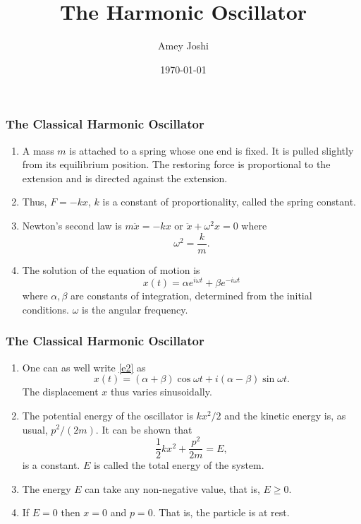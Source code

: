 \documentclass{beamer}
\title{The Harmonic Oscillator}
\author{Amey Joshi}
\date{\today}
\begin{document}
\begin{frame}
\titlepage
\end{frame}

\begin{frame}
\frametitle{The Classical Harmonic Oscillator}
\begin{enumerate}
\item A mass $m$ is attached to a spring whose one end is fixed. It is pulled
slightly from its equilibrium position. The restoring force is proportional to
the extension and is directed against the extension.
\item Thus, $F = -kx$, $k$ is a constant of proportionality, called the spring
constant.
\item Newton's second law is $m\ddot{x} = -kx$ or $\ddot{x} + \omega^2 x = 0$
where
\begin{equation}\label{e1}
\omega^2 = \frac{k}{m}.
\end{equation}
\item The solution of the equation of motion is
\begin{equation}\label{e2}
x(t) = \alpha e^{i\omega t} + \beta e^{-i\omega t}
\end{equation}
where $\alpha, \beta$ are constants of integration, determined from the initial
conditions. $\omega$ is the angular frequency.
\end{enumerate}
\end{frame}

\begin{frame}
\frametitle{The Classical Harmonic Oscillator}
\begin{enumerate}
\item One can as well write \eqref{e2} as
\begin{equation}\label{e3}
x(t) = (\alpha + \beta)\cos\omega t + i(\alpha - \beta)\sin\omega t.
\end{equation}
The displacement $x$ thus varies sinusoidally.
\item The potential energy of the oscillator is $kx^2/2$ and the kinetic energy
is, as usual, $p^2/(2m)$. It can be shown that
\begin{equation}\label{e4}
\frac{1}{2}kx^2 + \frac{p^2}{2m} = E,
\end{equation}
is a constant. $E$ is called the total energy of the system.
\item The energy $E$ can take any non-negative value, that is, $E \ge 0$.
\item If $E = 0$ then $x = 0$ and $p = 0$. That is, the particle is at rest.
\end{enumerate}
\end{frame}
\end{document}
